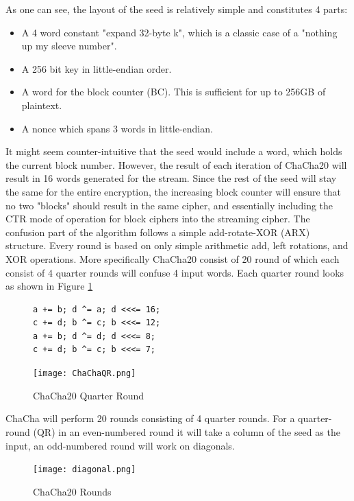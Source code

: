 \documentclass[a4paper, openany]{book}
\begin{document}
\begin{abstact}
As one can see, the layout of the seed is relatively simple and constitutes 4 parts:
\begin{itemize}
\itemsep 0em
\item A 4 word constant "expand 32-byte k", which is a classic case of a "nothing up my sleeve number".
\item A 256 bit key in little-endian order.
\item A word for the block counter (BC). This is sufficient for up to 256GB of plaintext.
\item A nonce which spans 3 words in little-endian.
\end{itemize}
It might seem counter-intuitive that the seed would include a word, which holds the current block number. However, the result of each iteration of ChaCha20 will result in 16 words generated for the stream. Since the rest of the seed will stay the same for the entire encryption, the increasing block counter will ensure that no two "blocks" should result in the same cipher, and essentially including the CTR mode of operation for block ciphers into the streaming cipher. The confusion part of the algorithm follows a simple add-rotate-XOR (ARX) structure. Every round is based on only simple arithmetic add, left rotations, and XOR operations. More specifically ChaCha20 consist of 20 round of which each consist of 4 quarter rounds will confuse 4 input words. Each quarter round looks as shown in Figure \ref{fig:ChaChaQR}
\begin{figure}[H]
\begin{minipage}{0.4\textwidth}
\begin{verbatim}
a += b; d ^= a; d <<<= 16;
c += d; b ^= c; b <<<= 12;
a += b; d ^= d; d <<<= 8;
c += d; b ^= c; b <<<= 7;
\end{verbatim}
\end{minipage}
\qquad
\begin{minipage}{0.4\textwidth}
\texttt{[image: ChaChaQR.png]}
\end{minipage}
\caption{ChaCha20 Quarter Round}
\label{fig:ChaChaQR}
\end{figure}
ChaCha will perform 20 rounds consisting of 4 quarter rounds. For a quarter-round (QR) in an even-numbered round it will take a column of the seed as the input, an odd-numbered round will work on diagonals.
\begin{figure}[H]
\centering
\texttt{[image: diagonal.png]}
\caption{ChaCha20 Rounds}
\label{fig:ChaChaRound}
\end{figure}


\end{abstact}
\end{document}

